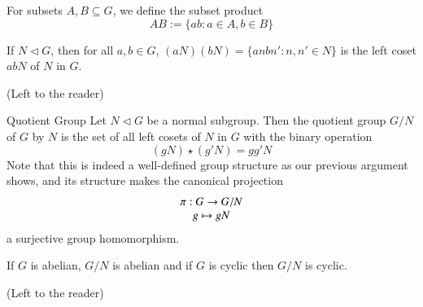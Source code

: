 \documentclass[12pt, a4paper, twoside, openright, titlepage]{book}
\begin{document}
\begin{nota*}{}{}
        For subsets $A,B\subseteq G$, we define the subset product \begin{equation}
                AB := \{ab:a\in A, b \in B\}
        \end{equation}
\end{nota*}

\begin{lem}{}{}
        If $N \vartriangleleft G$, then for all $a,b \in G$, $(aN)(bN) = \{anbn':n,n' \in N\}$ is the left coset $abN$ of $N$ in $G$.
\end{lem}
\begin{proof*}{}{}
        (Left to the reader)
\end{proof*}


\begin{defn}{Quotient Group}{}
        Let $N \vartriangleleft G$ be a normal subgroup. Then the quotient group $G/N$ of $G$ by $N$ is the set of all left cosets of $N$ in $G$ with the binary operation \begin{equation}
                (gN)\star(g'N) = gg'N
        \end{equation}
        Note that this is indeed a well-defined group structure as our previous argument shows, and its structure makes the canonical projection \begin{equation}
                \begin{array}{c} \pi:G\rightarrow G/N \\ g\mapsto gN \end{array}
        \end{equation}
        a surjective group homomorphism.
\end{defn}

\begin{cor}{}{}
        If $G$ is abelian, $G/N$ is abelian and if $G$ is cyclic then $G/N$ is cyclic.
\end{cor}
\begin{proof*}{}{}
        (Left to the reader)
\end{proof*}
\end{document}
